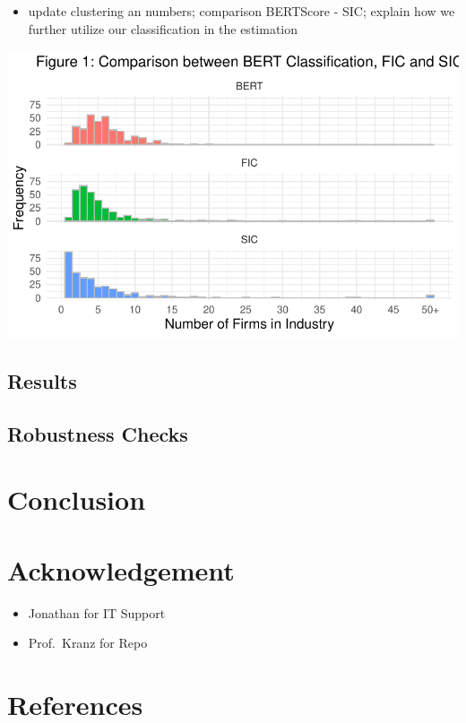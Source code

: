 \documentclass[
]{article}
\providecommand{\tightlist}{%
  \setlength{\itemsep}{0pt}\setlength{\parskip}{0pt}}\usepackage{longtable,booktabs,array}
\begin{document}
\begin{itemize}
\tightlist
\item
  update clustering an numbers; comparison BERTScore - SIC; explain how
  we further utilize our classification in the estimation
\end{itemize}

\includegraphics{ProjectEcoDataScience_files/figure-pdf/unnamed-chunk-4-1.pdf}

\subsection{Results}\label{results}

\subsection{Robustness Checks}\label{robustness-checks}

\section{Conclusion}\label{conclusion}

\section{Acknowledgement}\label{acknowledgement}

\begin{itemize}
\tightlist
\item
  Jonathan for IT Support
\item
  Prof.~Kranz for Repo
\end{itemize}

\newpage{}

\section{References}\label{references}
\end{document}
